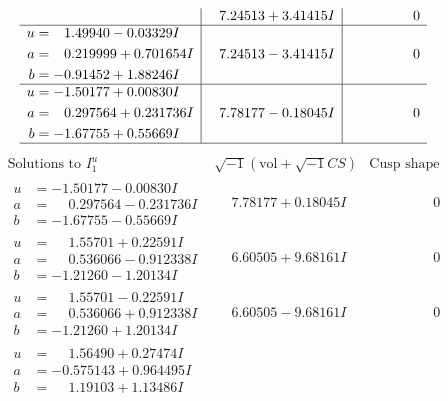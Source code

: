 \documentclass[1p]{elsarticle_modified}
\theoremstyle{definition}
\newcommand{\I}{\sqrt{-1}}
\begin{document}
$$\begin{array}{c|c|c}
 & \phantom{-}7.24513 + 3.41415 I & \phantom{-0.000000 } 0 \\ \hline\begin{aligned}
u &= \phantom{-}1.49940 - 0.03329 I \\
a &= \phantom{-}0.219999 + 0.701654 I \\
b &= -0.91452 + 1.88246 I\end{aligned}
 & \phantom{-}7.24513 - 3.41415 I & \phantom{-0.000000 } 0 \\ \hline\begin{aligned}
u &= -1.50177 + 0.00830 I \\
a &= \phantom{-}0.297564 + 0.231736 I \\
b &= -1.67755 + 0.55669 I\end{aligned}
 & \phantom{-}7.78177 - 0.18045 I & \phantom{-0.000000 } 0\\
 \hline 
 \end{array}$$\newpage$$\begin{array}{c|c|c}  
\text{Solutions to }I^u_{1}& \I (\text{vol} + \sqrt{-1}CS) & \text{Cusp shape}\\
 \hline 
\begin{aligned}
u &= -1.50177 - 0.00830 I \\
a &= \phantom{-}0.297564 - 0.231736 I \\
b &= -1.67755 - 0.55669 I\end{aligned}
 & \phantom{-}7.78177 + 0.18045 I & \phantom{-0.000000 } 0 \\ \hline\begin{aligned}
u &= \phantom{-}1.55701 + 0.22591 I \\
a &= \phantom{-}0.536066 - 0.912338 I \\
b &= -1.21260 - 1.20134 I\end{aligned}
 & \phantom{-}6.60505 + 9.68161 I & \phantom{-0.000000 } 0 \\ \hline\begin{aligned}
u &= \phantom{-}1.55701 - 0.22591 I \\
a &= \phantom{-}0.536066 + 0.912338 I \\
b &= -1.21260 + 1.20134 I\end{aligned}
 & \phantom{-}6.60505 - 9.68161 I & \phantom{-0.000000 } 0 \\ \hline\begin{aligned}
u &= \phantom{-}1.56490 + 0.27474 I \\
a &= -0.575143 + 0.964495 I \\
b &= \phantom{-}1.19103 + 1.13486 I\end{aligned}

\end{array}$$
\end{document}
